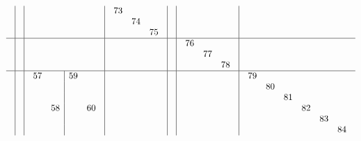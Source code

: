 \documentclass[12pt,a4paper,landscape]{amsart}
\begin{document}
\begin{align*}
\begin{array}{c|c|c|c|c|c|c}
\begin{array}{r|r|r|r}
\end{array}%
&&&
\begin{array}{rrr}%
73&  &  \\%
  &74&  \\%
  &  &75\\%
\end{array}%
&&\\\hline
&&&&&
\begin{array}{rrr}%
76&  &  \\%
  &77&  \\%
  &  &78\\%
\end{array}%
&\\\hline
&&
\begin{array}{rr|rr}%
57&  &59&  \\%
  &  &  &  \\%
  &  &  &  \\%
  &58&  &60\\%
  &  &  &  \\%
  &  &  &  \\%
\end{array}%
&&&&
\begin{array}{rrrrrr}%
79&  &  &  &  &  \\%
  &80&  &  &  &  \\%
  &  &81&  &  &  \\%
  &  &  &82&  &  \\%
  &  &  &  &83&  \\%
  &  &  &  &  &84\\%
\end{array}%
\end{array}
\end{align*}
\end{document}
